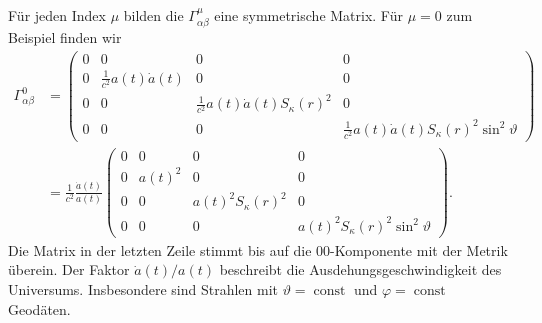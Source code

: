 Für jeden Index $\mu$ bilden die $\Gamma^\mu_{\alpha\beta}$
eine symmetrische Matrix.
Für $\mu=0$ zum Beispiel finden wir
\begin{align*}
\Gamma^0_{\alpha\beta}
&=
\begin{pmatrix}
0&0&0&0\\
0&\frac1{c^2} a(t)\dot a(t)& 0 & 0 \\
0 & 0 & \frac1{c^2}a(t)\dot a(t)S_\kappa(r)^2 & 0 \\
0 & 0 & 0 & \frac1{c^2} a(t)\dot a(t)S_\kappa(r)^2 \sin^2\vartheta
\end{pmatrix}
\\
&=
\frac1{c^2}
\frac{\dot a(t)}{a(t)}
\begin{pmatrix}
0&     0&                  0&                                 0\\
0&a(t)^2&                  0&                                 0\\
0&     0&a(t)^2S_\kappa(r)^2&                                 0\\
0&     0&                  0&a(t)^2S_\kappa(r)^2\sin^2\vartheta
\end{pmatrix}.
\end{align*}
Die Matrix in der letzten Zeile stimmt bis auf die $00$-Komponente
mit der Metrik überein.
Der Faktor $\dot a(t)/a(t)$ beschreibt die Ausdehungsgeschwindigkeit
des Universums.
Insbesondere sind Strahlen mit
$\vartheta=\operatorname{const}$
und
$\varphi=\operatorname{const}$
Geodäten.



